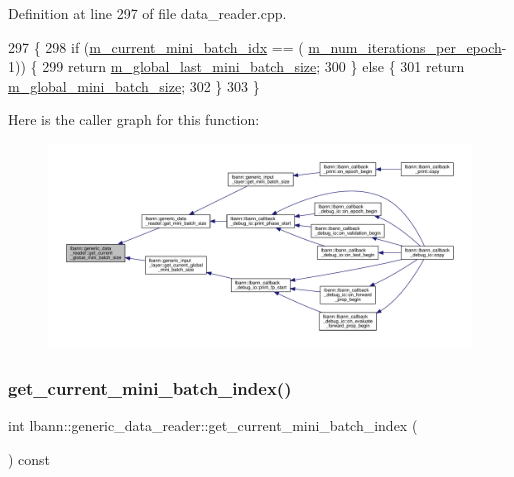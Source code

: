 Definition at line 297 of file data\+\_\+reader.\+cpp.


\begin{DoxyCode}
297                                                                   \{
298   \textcolor{keywordflow}{if} (\hyperlink{classlbann_1_1generic__data__reader_aefd4bc0bf95de1e2500827581acf3536}{m\_current\_mini\_batch\_idx} == (
      \hyperlink{classlbann_1_1generic__data__reader_ab570063483a1f604ca2fc536c3d83de7}{m\_num\_iterations\_per\_epoch}-1)) \{
299     \textcolor{keywordflow}{return} \hyperlink{classlbann_1_1generic__data__reader_a1d6f2d378a3f152e20b3def16f52c003}{m\_global\_last\_mini\_batch\_size};
300   \} \textcolor{keywordflow}{else} \{
301     \textcolor{keywordflow}{return} \hyperlink{classlbann_1_1generic__data__reader_a7cd8fa7b1db9ea3d154a411f36992476}{m\_global\_mini\_batch\_size};
302   \}
303 \}
\end{DoxyCode}
Here is the caller graph for this function\+:\nopagebreak
\begin{figure}[H]
\begin{center}
\leavevmode
\includegraphics[width=350pt]{classlbann_1_1generic__data__reader_a3f7114448c6b43a5aac30c002e4bade3_icgraph}
\end{center}
\end{figure}
\mbox{\label{classlbann_1_1generic__data__reader_a35521b27677081ee9ed30f25aeb3b508}} 
\subsubsection{\texorpdfstring{get\+\_\+current\+\_\+mini\+\_\+batch\+\_\+index()}{get\_current\_mini\_batch\_index()}}
{\footnotesize\ttfamily int lbann\+::generic\+\_\+data\+\_\+reader\+::get\+\_\+current\+\_\+mini\+\_\+batch\+\_\+index (\begin{DoxyParamCaption}{ }\end{DoxyParamCaption}) const\hspace{0.3cm}{\ttfamily [inline]}}




